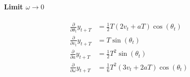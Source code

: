\documentclass{article}
\begin{document}
\paragraph{Limit $\omega \to 0$}
\begin{align*}
    \frac{\partial}{\partial \theta_t} y_{t+T} &=
    \frac{1}{2}T(2v_t + aT)\cos(\theta_t)
    \\
    \frac{\partial}{\partial v_t} y_{t+T} &=
    T\sin(\theta_t)
    \\
    \frac{\partial}{\partial a} y_{t+T} &=
    \frac{1}{2}T^2\sin(\theta_t)
    \\
    \frac{\partial}{\partial \omega} y_{t+T} &=
    \frac{1}{6}T^2(3v_t + 2aT)\cos(\theta_t)
    \\
\end{align*}
\end{document}
